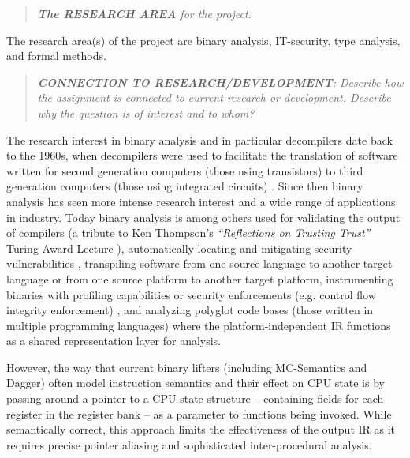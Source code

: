 \documentclass[12pt, a4paper]{article}
\begin{document}


\begin{quote}
	\textit{\textbf{The RESEARCH AREA} for the project.}
\end{quote}

The research area(s) of the project are binary analysis, IT-security, type analysis, and formal methods.

\begin{quote}
	\textit{\textbf{CONNECTION TO RESEARCH/DEVELOPMENT}: Describe how the assignment is connected to current research or development. Describe why the question is of interest and to whom?}
\end{quote}

The research interest in binary analysis and in particular decompilers date back to the 1960s, when decompilers were used to facilitate the translation of software written for second generation computers (those using transistors) to third generation computers (those using integrated circuits) \cite{reverse_compilation}. Since then binary analysis has seen more intense research interest and a wide range of applications in industry. Today binary analysis is among others used for validating the output of compilers (a tribute to Ken Thompson's \textit{``Reflections on Trusting Trust''} Turing Award Lecture \cite{trusting_trust}), automatically locating and mitigating security vulnerabilities \cite{state_of_the_art_of_war}, transpiling software from one source language to another target language or from one source platform to another target platform, instrumenting binaries with profiling capabilities or security enforcements (e.g. control flow integrity enforcement) \cite{superset_disassembly}, and analyzing polyglot code bases (those written in multiple programming languages) where the platform-independent IR functions as a shared representation layer for analysis.

However, the way that current binary lifters (including MC-Semantics and Dagger) often model instruction semantics and their effect on CPU state is by passing around a pointer to a CPU state structure -- containing fields for each register in the register bank -- as a parameter to functions being invoked. While semantically correct, this approach limits the effectiveness of the output IR as it requires precise pointer aliasing and sophisticated inter-procedural analysis.
\end{document}
